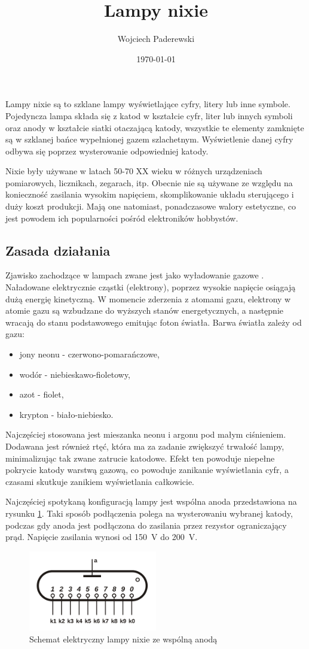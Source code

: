 \documentclass[../main.tex]{subfiles}
\author{Wojciech Paderewski}
\date{\today}
\title{Lampy nixie}
\begin{document}
Lampy nixie są to szklane lampy wyświetlające cyfry, litery lub inne symbole.
Pojedyncza lampa składa się z katod w kształcie cyfr, liter lub innych symboli oraz anody w kształcie siatki otaczającą katody, wszystkie
te elementy zamknięte są w szklanej bańce wypełnionej gazem szlachetnym.
Wyświetlenie danej cyfry odbywa się poprzez wysterowanie odpowiedniej katody.

Nixie były używane w latach 50-70 XX wieku w różnych urządzeniach pomiarowych, licznikach, zegarach, itp. 
Obecnie nie są używane ze względu na konieczność zasilania wysokim napięciem, skomplikowanie układu sterującego i duży koszt produkcji.
Mają one natomiast, ponadczasowe walory estetyczne, co jest powodem ich popularności pośród elektroników hobbystów.

\subsection{Zasada działania}
Zjawisko zachodzące w lampach zwane jest jako wyładowanie gazowe \cite{st:nixie}.
Naładowane elektrycznie cząstki (elektrony), poprzez wysokie napięcie osiągają dużą energię kinetyczną.
W momencie zderzenia z atomami gazu, elektrony w atomie gazu są wzbudzane do wyższych stanów energetycznych, a następnie wracają do stanu podstawowego emitując foton światła.
Barwa światła zależy od gazu:
\begin{itemize}
  \item jony neonu - czerwono-pomarańczowe,
  \item wodór - niebieskawo-fioletowy,
  \item azot - fiolet,
  \item krypton - biało-niebiesko.
\end{itemize}

Najczęściej stosowana jest mieszanka neonu i argonu pod małym ciśnieniem. Dodawana jest również rtęć, 
która ma za zadanie zwiększyć trwałość lampy, 
minimalizując tak zwane zatrucie katodowe. Efekt ten powoduje niepełne pokrycie katody warstwą gazową, co powoduje zanikanie wyświetlania cyfr,
a czasami skutkuje zanikiem wyświetlania całkowicie.

Najczęściej spotykaną konfiguracją lampy jest wspólna anoda przedstawiona na rysunku \ref{fig:nixie_schematic}.
Taki sposób podłączenia polega na wysterowaniu wybranej katody, podczas gdy anoda jest podłączona
do zasilania przez rezystor ograniczający prąd. 
Napięcie zasilania wynosi od \SI{150}{\volt} do \SI{200}{\volt}.

\begin{figure}[H]
  \centering
  \includegraphics[width=0.5\textwidth]{Nixie_schematic.png}
  \caption{Schemat elektryczny lampy nixie ze wspólną anodą \cite{st:nixie-jpg}}
  \label{fig:nixie_schematic}
\end{figure}
\end{document}
